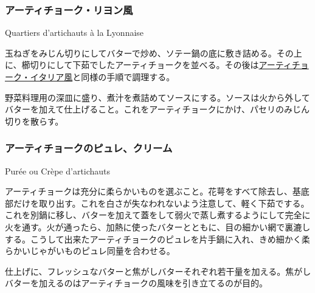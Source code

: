 \begin{recette}
\atoaki{}

\hypertarget{quartiers-d-artichauts-a-la-lyonnaise}{%
\subsubsection{アーティチョーク・リヨン風}\label{quartiers-d-artichauts-a-la-lyonnaise}}

\begin{frsubenv}

Quartiers d'artichauts à la Lyonnaise

\end{frsubenv}


玉ねぎをみじん切りにしてバターで炒め、ソテー鍋の底に敷き詰める。その上に、櫛切りにして下茹でしたアーティチョークを並べる。その後は\protect\hyperlink{quartiers-d-artichauts-a-l-italienne}{アーティチョーク・イタリア風}と同様の手順で調理する。

野菜料理用の深皿に盛り、煮汁を煮詰めてソースにする。ソースは火から外してバターを加えて仕上げること。これをアーティチョークにかけ、パセリのみじん切りを散らす。

\atoaki{}

\hypertarget{puree-ou-creme-d-artichauts}{%
\subsubsection{アーティチョークのピュレ、クリーム}\label{puree-ou-creme-d-artichauts}}

\begin{frsubenv}

Purée ou Crèpe d'artichauts

\end{frsubenv}


アーティチョークは充分に柔らかいものを選ぶこと。花萼をすべて除去し、基底部だけを取り出す。これを白さが失なわれないよう注意して、軽く下茹でする。これを別鍋に移し、バターを加えて蓋をして弱火で蒸し煮するようにして完全に火を通す。火が通ったら、加熱に使ったバターとともに、目の細かい網で裏漉しする。こうして出来たアーティチョークのピュレを片手鍋に入れ、きめ細かく柔らかいじゃがいものピュレ同量を合わせる。

仕上げに、フレッシュなバターと焦がしバターそれぞれ若干量を加える。焦がしバターを加えるのはアーティチョークの風味を引き立てるのが目的。


\end{recette}
